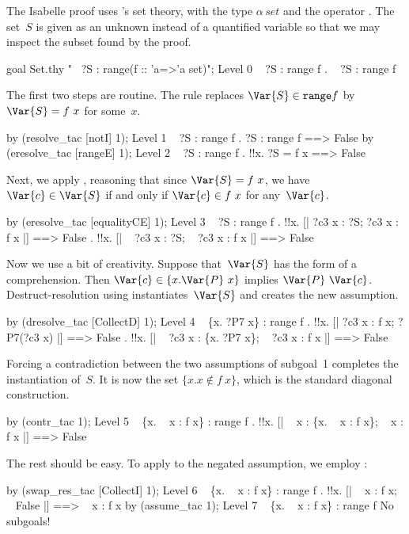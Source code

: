 The Isabelle proof uses \CHOL's set theory, with the type $\alpha\,set$ and
the operator .  The set~$S$ is given as an unknown instead of a
quantified variable so that we may inspect the subset found by the proof.
\begin{ttbox}
goal Set.thy "~ ?S : range(f :: 'a=>'a set)";
{\out Level 0}
{\out ~ ?S : range f}
{. ~ ?S : range f}
\end{ttbox}
The first two steps are routine.  The rule  replaces
$\Var{S}\in {\tt range} f$ by $\Var{S}=f~x$ for some~$x$.
\begin{ttbox}
by (resolve_tac [notI] 1);
{\out Level 1}
{\out ~ ?S : range f}
{. ?S : range f ==> False}
\ttbreak
by (eresolve_tac [rangeE] 1);
{\out Level 2}
{\out ~ ?S : range f}
{. !!x. ?S = f x ==> False}
\end{ttbox}
Next, we apply , reasoning that since $\Var{S}=f~x$,
we have $\Var{c}\in \Var{S}$ if and only if $\Var{c}\in f~x$ for
any~$\Var{c}$.
\begin{ttbox}
by (eresolve_tac [equalityCE] 1);
{\out Level 3}
{\out ~ ?S : range f}
{. !!x. [| ?c3 x : ?S; ?c3 x : f x |] ==> False}
{. !!x. [| ~ ?c3 x : ?S; ~ ?c3 x : f x |] ==> False}
\end{ttbox}
Now we use a bit of creativity.  Suppose that~$\Var{S}$ has the form of a
comprehension.  Then $\Var{c}\in\{x.\Var{P}~x\}$ implies
$\Var{P}~\Var{c}$.   Destruct-resolution using 
instantiates~$\Var{S}$ and creates the new assumption.
\begin{ttbox}
by (dresolve_tac [CollectD] 1);
{\out Level 4}
{\out ~ \{x. ?P7 x\} : range f}
{. !!x. [| ?c3 x : f x; ?P7(?c3 x) |] ==> False}
{. !!x. [| ~ ?c3 x : \{x. ?P7 x\}; ~ ?c3 x : f x |] ==> False}
\end{ttbox}
Forcing a contradiction between the two assumptions of subgoal~1 completes
the instantiation of~$S$.  It is now the set $\{x. x\not\in f~x\}$, which
is the standard diagonal construction.
\begin{ttbox}
by (contr_tac 1);
{\out Level 5}
{\out ~ \{x. ~ x : f x\} : range f}
{. !!x. [| ~ x : \{x. ~ x : f x\}; ~ x : f x |] ==> False}
\end{ttbox}
The rest should be easy.  To apply  to the negated
assumption, we employ :
\begin{ttbox}
by (swap_res_tac [CollectI] 1);
{\out Level 6}
{\out ~ \{x. ~ x : f x\} : range f}
{. !!x. [| ~ x : f x; ~ False |] ==> ~ x : f x}
\ttbreak
by (assume_tac 1);
{\out Level 7}
{\out ~ \{x. ~ x : f x\} : range f}
{\out No subgoals!}
\end{ttbox}
